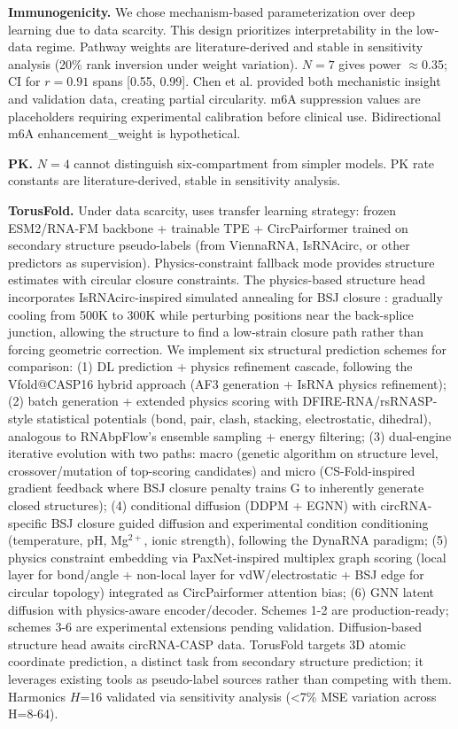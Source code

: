 \documentclass[11pt,a4paper]{article}
\begin{document}
\textbf{Immunogenicity.} We chose mechanism-based parameterization over deep learning due to data scarcity. This design prioritizes interpretability in the low-data regime. Pathway weights are literature-derived and stable in sensitivity analysis (20\% rank inversion under weight variation). $N=7$ gives power $\approx$0.35; CI for $r=0.91$ spans [0.55, 0.99]. Chen et al. \citep{chen2019} provided both mechanistic insight and validation data, creating partial circularity. m6A suppression values are placeholders requiring experimental calibration before clinical use. Bidirectional m6A enhancement\_weight is hypothetical.

\textbf{PK.} $N=4$ cannot distinguish six-compartment from simpler models. PK rate constants are literature-derived, stable in sensitivity analysis.

\textbf{TorusFold.} Under data scarcity, uses transfer learning strategy: frozen ESM2/RNA-FM backbone + trainable TPE + CircPairformer trained on secondary structure pseudo-labels (from ViennaRNA, IsRNAcirc, or other predictors as supervision). Physics-constraint fallback mode provides structure estimates with circular closure constraints. The physics-based structure head incorporates IsRNAcirc-inspired simulated annealing for BSJ closure \citep{jiang2024isrnacirc}: gradually cooling from 500K to 300K while perturbing positions near the back-splice junction, allowing the structure to find a low-strain closure path rather than forcing geometric correction. We implement six structural prediction schemes for comparison: (1) DL prediction + physics refinement cascade, following the Vfold@CASP16 hybrid approach (AF3 generation + IsRNA physics refinement); (2) batch generation + extended physics scoring with DFIRE-RNA/rsRNASP-style statistical potentials (bond, pair, clash, stacking, electrostatic, dihedral), analogous to RNAbpFlow's ensemble sampling + energy filtering; (3) dual-engine iterative evolution with two paths: macro (genetic algorithm on structure level, crossover/mutation of top-scoring candidates) and micro (CS-Fold-inspired gradient feedback where BSJ closure penalty trains G to inherently generate closed structures); (4) conditional diffusion (DDPM + EGNN) with circRNA-specific BSJ closure guided diffusion and experimental condition conditioning (temperature, pH, Mg$^{2+}$, ionic strength), following the DynaRNA paradigm; (5) physics constraint embedding via PaxNet-inspired multiplex graph scoring (local layer for bond/angle + non-local layer for vdW/electrostatic + BSJ edge for circular topology) integrated as CircPairformer attention bias; (6) GNN latent diffusion with physics-aware encoder/decoder. Schemes 1-2 are production-ready; schemes 3-6 are experimental extensions pending validation. Diffusion-based structure head awaits circRNA-CASP data. TorusFold targets 3D atomic coordinate prediction, a distinct task from secondary structure prediction; it leverages existing tools as pseudo-label sources rather than competing with them. Harmonics $H$=16 validated via sensitivity analysis (<7\% MSE variation across H=8-64).
\end{document}

